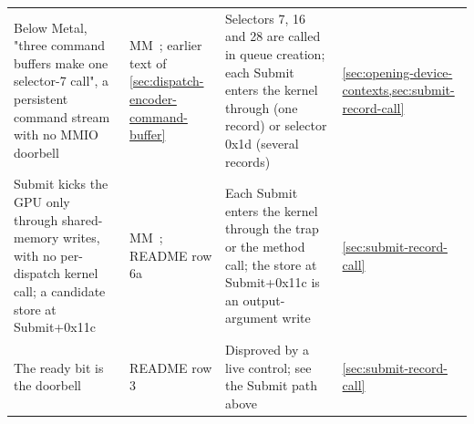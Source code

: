 \begin{xltabular}{\linewidth}{@{}>{\hsize}X>{\hsize}X>{\hsize}X>{\hsize}X@{}}
Below Metal, "three command buffers make one selector-7 call", a
persistent command stream with no MMIO doorbell & MM~; earlier text of 
\cref{sec:dispatch-encoder-command-buffer} & Selectors 7, 16 and 28 are called in queue creation; each Submit enters
the kernel through  (one record) or
 selector 0x1d (several records) & \cref{sec:opening-device-contexts,sec:submit-record-call} \\
Submit kicks the GPU only through shared-memory writes, with no
per-dispatch kernel call; a candidate store at Submit+0x11c & MM~; README row 6a & Each Submit enters the kernel through the trap or the method call; the
store at Submit+0x11c is an output-argument write & \cref{sec:submit-record-call} \\
The  ready bit is the doorbell & README row 3 & Disproved by a live control; see the Submit path above & \cref{sec:submit-record-call} \\
\bottomrule
\end{xltabular}

